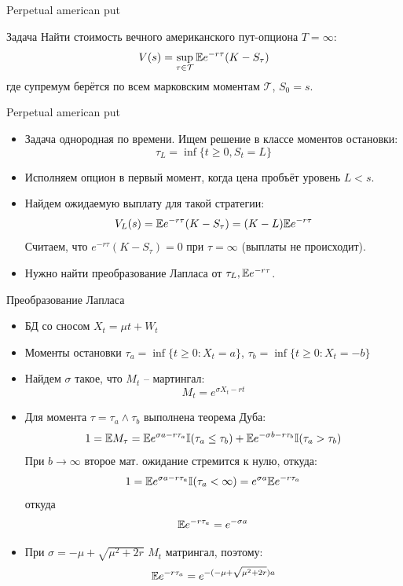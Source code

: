 \documentclass[aspectratio=169]{beamer}
\begin{document}
\begin{frame}{Perpetual american put}
    \begin{block}{Задача}
        Найти стоимость вечного американского пут-опциона $T=\infty$:
        $$
            V(s) = \sup_{\tau \in \mathcal{T}} \mathbb{E} e^{-r\tau} (K-S_{\tau})
        $$где супремум берётся по всем марковским моментам $\mathcal{T}$, $S_0 = s$.
    \end{block}
\end{frame}

\begin{frame}{Perpetual american put}
    \begin{itemize}
        \item Задача однородная по времени. Ищем решение в классе моментов остановки:
        $$
            \tau_L = \inf\{t \geq 0, S_t = L\}
        $$
        \item Исполняем опцион в первый момент, когда цена пробъёт уровень $L < s$.
        \item Найдем ожидаемую выплату для такой стратегии:
        $$
            V_L(s) = \mathbb{E} e^{-r\tau}(K-S_{\tau})
            = (K-L)\mathbb{E} e^{-r\tau}
        $$Считаем, что $e^{-r\tau}(K-S_{\tau})=0$ при $\tau = \infty$ (выплаты не происходит).
        \item Нужно найти преобразование Лапласа от $\tau_L, \mathbb{E} e^{-r\tau}$.
    \end{itemize}
\end{frame}

\begin{frame}{Преобразование Лапласа}
    \begin{itemize}
        \item БД со сносом $X_t = \mu t + W_t$
        \item Моменты остановки 
        $\tau_a = \inf\{t \geq 0: X_t = a\}$,
        $\tau_b = \inf\{t \geq 0: X_t = -b\}$
        \item Найдем $\sigma$ такое, что $M_t$ -- мартингал:
        $$
            M_t = e^{\sigma X_t - r t}
        $$
        \item Для момента $\tau = \tau_a \land \tau_b$ выполнена теорема Дуба:
        $$
            1 = \mathbb{E} M_{\tau} = 
            \mathbb{E} e^{\sigma a - r \tau_a} \mathbb{I}(\tau_a \leq \tau_b)
            + \mathbb{E} e^{-\sigma b - r \tau_b} \mathbb{I}(\tau_a > \tau_b) 
        $$При $b\to \infty$ второе мат. ожидание стремится к нулю, откуда:
        $$
            1 = \mathbb{E} e^{\sigma a - r \tau_a} \mathbb{I}(\tau_a < \infty)
            = e^{\sigma a} \mathbb{E} e^{- r \tau_a}
        $$откуда
        $$
            \mathbb{E} e^{-r\tau_a} = e^{-\sigma a}
        $$
        \item При $\sigma = -\mu + \sqrt{\mu^2 + 2r}$ $M_t$ матрингал, поэтому:
        $$
        \mathbb{E} e^{-r\tau_a} = e^{-(-\mu + \sqrt{\mu^2 + 2r}) a}
        $$
    \end{itemize}
\end{frame}
\end{document}
